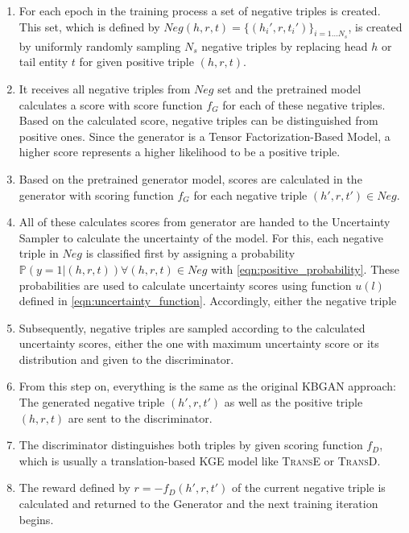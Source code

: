\begin{enumerate}
    \item For each epoch in the training process a set of negative triples is created.
    This set, which is defined by $Neg(h,r,t)=\{(h_i',r,t_i')\}_{i=1\dots N_s}$, is created by uniformly randomly sampling $N_s$ negative triples by replacing head $h$ or tail entity $t$ for given positive triple $(h, r, t)$.
    
    \item 
    It receives all negative triples from $Neg$ set and the pretrained model calculates a score with score function $f_G$ for each of these negative triples.
    Based on the calculated score, negative triples can be distinguished from positive ones. Since the generator is a Tensor Factorization-Based Model, a higher score represents a higher likelihood to be a positive triple.
    
    \item 
    Based on the pretrained generator model, scores are calculated in the generator with scoring function $f_G$ for each negative triple $(h',r,t') \in Neg$.
    
    \item 
    All of these calculates scores from generator are handed to the Uncertainty Sampler to calculate the uncertainty of the model.
    For this, each negative triple in $Neg$ is classified first by assigning a probability $\mathds{P}(y = 1 | (h,r,t)) \forall (h,r,t) \in Neg$ with \autoref{eqn:positive_probability}.
    These probabilities are used to calculate uncertainty scores using function $u(l)$ defined in \autoref{eqn:uncertainty_function}.
    Accordingly, either the negative triple


    \item Subsequently, negative triples are sampled according to the calculated uncertainty scores, either the one with maximum uncertainty score or its distribution 
    and given to the discriminator.
    
    \item 
    From this step on, everything is the same as the original \ac{KBGAN} approach:
    The generated negative triple $(h',r,t')$ as well as the positive triple $(h, r, t)$ are sent to the discriminator.
    
    \item 
    The discriminator distinguishes both triples by given scoring function $f_D$, which is usually a translation-based \ac{KGE} model like \textsc{TransE} or \textsc{TransD}.
    
    \item 
    The reward defined by $r = - f_D(h',r,t')$ of the current negative triple is calculated and returned to the Generator and the next training iteration begins.
\end{enumerate}
